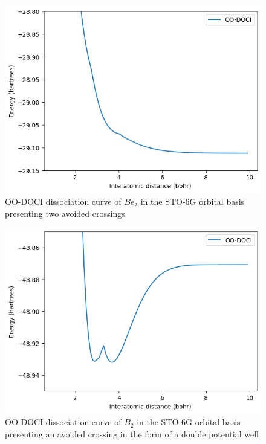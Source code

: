 \documentclass[twoside,twocolumn,9pt]{article}
\begin{document}
\begin{figure}
  \includegraphics[width=\linewidth]{Be2.png}
  \caption{OO-DOCI dissociation curve of $Be_2$ in the STO-6G orbital basis presenting two avoided crossings}\label{Be2}
\end{figure}

\begin{figure}
  \includegraphics[width=\linewidth]{B2.png}
  \caption{OO-DOCI dissociation curve of $B_2$ in the STO-6G orbital basis presenting an avoided crossing in the form of a double potential well}\label{B2}
\end{figure}
\end{document}
